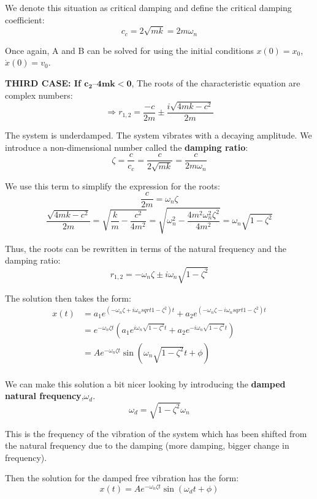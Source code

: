 \documentclass[12pt,letterpaper,twoside]{report}
\begin{document}
We denote this situation as critical damping and define the critical damping coefficient: 
\[
c_c = 2 \sqrt{mk}= 2 m \omega_n
\]

Once again, A and B can be solved for using the initial conditions $x(0) = x_0$,  $\dot{x} (0) = v_0$. 

\newpage

\vspace*{12\baselineskip}

\textbf{THIRD CASE: If $\bm{c_2 – 4mk<0}$}, The roots of the characteristic equation are complex numbers:
\[
\Rightarrow r_{1,2} = \frac{-c}{2m} \pm \frac{i \sqrt{4mk - c^2}}{2m}
\]

The system is underdamped.  The system vibrates with a decaying amplitude.  We introduce a non-dimensional number called the \textbf{damping ratio}:
\[
\zeta = \frac{c}{c_c} = \frac{c}{2 \sqrt{mk}} = \frac{c}{2m \omega_n}
\]

We use this term to simplify the expression for the roots:
\[
\frac{c}{2m} =  \omega_n \zeta
\]
\[
\frac{\sqrt{4mk - c^2}}{2m} = \sqrt{ \frac{k}{m} - \frac{c^2}{4m^2}} = \sqrt{\omega_n^2 - \frac{4m^2 \omega_n^2 \zeta^2}{4m^2}} = \omega_n \sqrt{1- \zeta^2}
\]

Thus, the roots can be rewritten in terms of the natural frequency and the damping ratio:
\[
r_{1, 2} = - \omega_n \zeta \pm i \omega_n \sqrt{1 - \zeta^2}
\]

The solution then takes the form:
\begin{align*}
x(t) &= a_1 e^{(-\omega_n \zeta + i \omega_n sqrt{1-\zeta^2})t} + a_2 e^{(-\omega_n \zeta - i \omega_n sqrt{1-\zeta^2})t}\\
&= e^{- \omega_n \zeta t} (a_1 e^{i \omega_n \sqrt{1- \zeta^2}t} + a_2 e^{-i \omega_n \sqrt{1- \zeta^2}t})\\
&= A e^{- \omega_n \zeta t} \sin{( \omega_n \sqrt{1-\zeta^2}t + \phi)}\\
\end{align*}

\vspace*{16\baselineskip}

We can make this solution a bit nicer looking by introducing the \textbf{damped natural frequency},$\omega_d$. 
\[ \omega_d = \sqrt{1-\zeta^2} \omega_n \]

This is the frequency of the vibration of the system which has been shifted from the natural frequency due to the damping (more damping, bigger change in frequency). 

Then the solution for the damped free vibration has the form:
\[
x(t) = A e^{-\omega_n \zeta t} \sin (\omega_d t+ \phi)
\]
\end{document}
